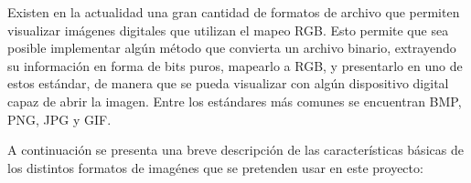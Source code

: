 Existen en la actualidad una gran cantidad de formatos de archivo que permiten visualizar imágenes digitales que utilizan el mapeo RGB. Esto permite que sea posible implementar algún método que convierta un archivo binario, extrayendo su información en forma de bits puros, mapearlo a RGB, y presentarlo en uno de estos  estándar, de manera que se pueda visualizar con algún dispositivo digital capaz de abrir la imagen. Entre los estándares más comunes se encuentran BMP, PNG, JPG y GIF.


A continuación se presenta una breve descripción de las características básicas de los distintos formatos de imagénes que se pretenden usar en este proyecto:

